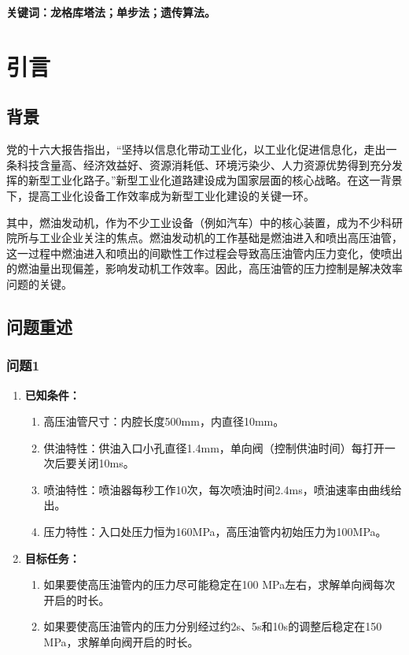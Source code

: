 \documentclass{article}
\newcounter{sub}
\begin{document}
\textbf{关键词：龙格库塔法；单步法；遗传算法。}

\newpage



\tableofcontents
\listoffigures
\listoftables
\listofexercises

\newpage

\setcounter{section}{-1}


\section{引言}%
\label{sec:引言}

\subsection{背景}%
\label{sub:背景}
党的十六大报告指出，“坚持以信息化带动工业化，以工业化促进信息化，走出一条科技含量高、经济效益好、资源消耗低、环境污染少、人力资源优势得到充分发挥的新型工业化路子。”新型工业化道路建设成为国家层面的核心战略。在这一背景下，提高工业化设备工作效率成为新型工业化建设的关键一环。

其中，燃油发动机，作为不少工业设备（例如汽车）中的核心装置，成为不少科研院所与工业企业关注的焦点。燃油发动机的工作基础是燃油进入和喷出高压油管，这一过程中燃油进入和喷出的间歇性工作过程会导致高压油管内压力变化，使喷出的燃油量出现偏差，影响发动机工作效率。因此，高压油管的压力控制是解决效率问题的关键。\cite{2011柴油机高压共轨分段喷射压力控制系统}


\subsection{问题重述}%
\label{sub:问题重述}
\subsubsection{问题1}
\begin{enumerate}
	\item \textbf{已知条件：}
		\begin{enumerate}
			\item 高压油管尺寸：内腔长度500mm，内直径10mm。
			\item 供油特性：供油入口小孔直径1.4mm，单向阀（控制供油时间）每打开一次后要关闭10ms。
			\item 喷油特性：喷油器每秒工作10次，每次喷油时间2.4ms，喷油速率由曲线给出。
			\item 压力特性：入口处压力恒为160MPa，高压油管内初始压力为100MPa。
		\end{enumerate}

	\item \textbf{目标任务：}
		\begin{enumerate}
			\item 如果要使高压油管内的压力尽可能稳定在100 MPa左右，求解单向阀每次开启的时长。
			\item 如果要使高压油管内的压力分别经过约2s、5s和10s的调整后稳定在150 MPa，求解单向阀开启的时长。
		\end{enumerate}
\end{enumerate}
\end{document}
